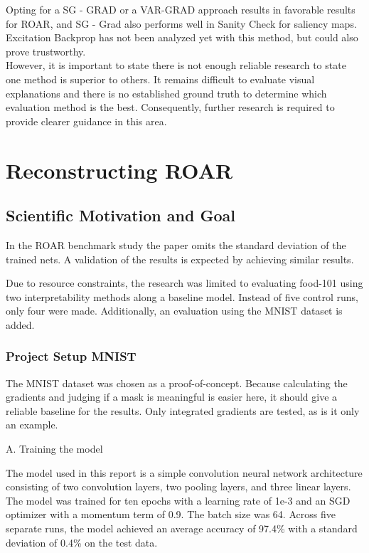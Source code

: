 Opting for a SG - GRAD or a VAR-GRAD approach results in favorable results for ROAR, and SG - Grad also performs well in Sanity Check for saliency maps. Excitation Backprop has not been analyzed yet with this method, but could also prove trustworthy. \\
However, it is important to state there is not enough reliable research to state one method is superior to others. It remains difficult to evaluate visual explanations and there is no established ground truth to determine which evaluation method is the best. Consequently, further research is required to provide clearer guidance in this area.


\chapter{Reconstructing ROAR} %
\label{sec:project}


\section{Scientific Motivation and Goal}
In the ROAR benchmark study \cite{hooker2019benchmark} the paper omits the standard deviation of the trained nets. A validation of the results is expected by achieving similar results.

Due to resource constraints, the research was limited to evaluating food-101 \cite{bossard14} using two interpretability methods along a baseline model. Instead of five control runs, only four were made. Additionally, an evaluation using the MNIST dataset is added.

\subsection{Project Setup MNIST}


The MNIST dataset \cite{deng2012mnist} was chosen as a proof-of-concept. Because calculating the gradients and judging if a mask is meaningful is easier here, it should give a reliable baseline for the results. Only integrated gradients are tested, as is it only an example.

A. Training the model

The model used in this report is a simple convolution neural network architecture consisting of two convolution layers, two pooling layers, and three linear layers. The model was trained for ten epochs with a learning rate of 1e-3 and an SGD optimizer with a momentum term of 0.9. The batch size was 64. Across five separate runs, the model achieved an average accuracy of 97.4\% with a standard deviation of 0.4\% on the test data.

